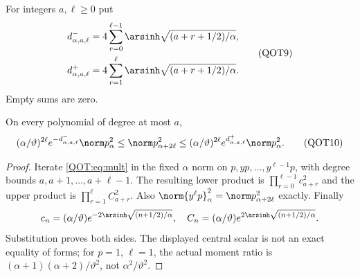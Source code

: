 \documentclass[11pt,a4paper]{article}
\begin{document}
For integers $a,\ell\ge0$ put
\begin{equation}
\begin{split}
 d^-_{\alpha,a,\ell}
 &=4\sum_{r=0}^{\ell-1}\arsinh\sqrt{(a+r+1/2)/\alpha},\\
 d^+_{\alpha,a,\ell}
 &=4\sum_{r=1}^{\ell}\arsinh\sqrt{(a+r+1/2)/\alpha}.
\end{split}\label{QOT:eq:ds}
\tag{QOT9}
\end{equation}
Empty sums are zero.
\begin{QOTtheorem}\label{QOT:thm:weights}
On every polynomial of degree at most $a$,
\begin{equation}
 (\alpha/\vartheta)^{2\ell}e^{-d^-_{\alpha,a,\ell}}\norm p_\alpha^2
 \le\norm p_{\alpha+2\ell}^2
 \le(\alpha/\vartheta)^{2\ell}e^{d^+_{\alpha,a,\ell}}\norm p_\alpha^2.
 \label{QOT:eq:weightshift}
\tag{QOT10}
\end{equation}
\end{QOTtheorem}
\begin{proof}
Iterate \eqref{QOT:eq:mult} in the fixed $\alpha$ norm on $p,yp,\ldots,y^{\ell-1}p$, with degree bounds $a,a+1,\ldots,a+\ell-1$. The resulting lower product is $\prod_{r=0}^{\ell-1}c_{a+r}^2$ and the upper product is $\prod_{r=1}^{\ell}C_{a+r}^2$. Also $\norm{y^\ell p}_\alpha^2=\norm p_{\alpha+2\ell}^2$ exactly. Finally
\[
 c_n=(\alpha/\vartheta)e^{-2\arsinh\sqrt{(n+1/2)/\alpha}},\quad
 C_n=(\alpha/\vartheta)e^{2\arsinh\sqrt{(n+1/2)/\alpha}}.
\]
Substitution proves both sides. The displayed central scalar is not an exact equality of forms; for $p=1$, $\ell=1$, the actual moment ratio is $(\alpha+1)(\alpha+2)/\vartheta^2$, not $\alpha^2/\vartheta^2$.
\end{proof}
\end{document}
